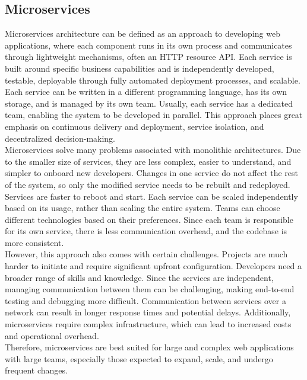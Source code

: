 \subsection{Microservices}
Microservices architecture can be defined as an approach to developing web applications, where each component runs in its own process and communicates through lightweight mechanisms, often an HTTP resource API. Each service is built around specific business capabilities and is independently developed, testable, deployable through fully automated deployment processes, and scalable. Each service can be written in a different programming language, has its own storage, and is managed by its own team. Usually, each service has a dedicated team, enabling the system to be developed in parallel. This approach places great emphasis on continuous delivery and deployment, service isolation, and decentralized decision-making. \\

\noindent
Microservices solve many problems associated with monolithic architectures. Due to the smaller size of services, they are less complex, easier to understand, and simpler to onboard new developers. Changes in one service do not affect the rest of the system, so only the modified service needs to be rebuilt and redeployed. Services are faster to reboot and start. Each service can be scaled independently based on its usage, rather than scaling the entire system. Teams can choose different technologies based on their preferences. Since each team is responsible for its own service, there is less communication overhead, and the codebase is more consistent. \\

\noindent
However, this approach also comes with certain challenges. Projects are much harder to initiate and require significant upfront configuration. Developers need a broader range of skills and knowledge. Since the services are independent, managing communication between them can be challenging, making end-to-end testing and debugging more difficult. Communication between services over a network can result in longer response times and potential delays. Additionally, microservices require complex infrastructure, which can lead to increased costs and operational overhead. \\

\noindent
Therefore, microservices are best suited for large and complex web applications with large teams, especially those expected to expand, scale, and undergo frequent changes. \cite{Microservices}\cite{MFMotivations}
